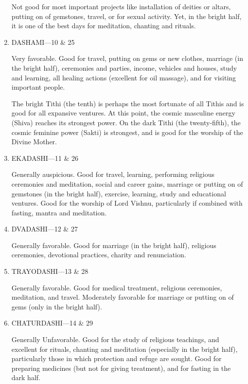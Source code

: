 \begin{enumerate}
Not good for most important projects like installation of deities or altars, putting on of gemstones, travel, or for sexual activity. Yet, in the bright half, it is one of the best days for meditation, chanting and rituals.

 

\item[ ] DASHAMI—10 \& 25

Very favorable. Good for travel, putting on gems or new clothes, marriage (in the bright half), ceremonies and parties, income, vehicles and houses, study and learning, all healing actions (excellent for oil massage), and for visiting important people.

The bright Tithi (the tenth) is perhaps the most fortunate of all Tithis and is good for all expansive ventures. At this point, the cosmic masculine energy (Shiva) reaches its strongest power. On the dark Tithi (the twenty-fifth), the cosmic feminine power (Sakti) is strongest, and is good for the worship of the Divine Mother.

 

\item[ ] EKADASHI—11 \& 26

Generally auspicious. Good for travel, learning, performing religious ceremonies and meditation, social and career gains, marriage or putting on of gemstones (in the bright half), exercise, learning, study and educational ventures. Good for the worship of Lord Vishnu, particularly if combined with fasting, mantra and meditation.

 

\item[ ] DVADASHI—12 \& 27

Generally favorable. Good for marriage (in the bright half), religious ceremonies, devotional practices, charity and renunciation.

 

\item[ ] TRAYODASHI—13 \& 28

Generally favorable. Good for medical treatment, religious ceremonies, meditation, and travel. Moderately favorable for marriage or putting on of gems (only in the bright half).

 

\item[ ] CHATURDASHI—14 \& 29

Generally Unfavorable. Good for the study of religious teachings, and excellent for rituals, chanting and meditation (especially in the bright half), particularly those in which protection and refuge are sought. Good for preparing medicines (but not for giving treatment), and for fasting in the dark half.


\end{enumerate}
